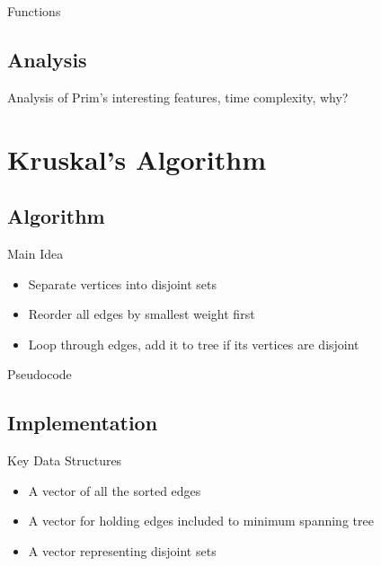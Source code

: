 \documentclass{beamer}
\begin{document}
\begin{frame}{Functions}
\begin{frame}

\subsection{Analysis}
\begin{frame}{Analysis of Prim's}
    interesting features, time complexity, why?
\end{frame}


\section{Kruskal's Algorithm}\frame{\sectionpage}
\subsection{Algorithm}
\begin{frame}{Main Idea}
    \begin{itemize}
    \item Separate vertices into disjoint sets
    \item Reorder all edges by smallest weight first
    \item Loop through edges, add it to tree if its vertices are disjoint
    \end{itemize}
\end{frame}


\begin{frame}{Pseudocode}
\vkruskal
\end{frame}

\subsection{Implementation}
\begin{frame}{Key Data Structures}
    \begin{itemize}
    \item A vector of all the sorted edges
    \item A vector for holding edges included to minimum spanning tree
    \item A vector representing disjoint sets
    \end{itemize}
\end{frame}


\end{frame}
\end{frame}
\end{document}
